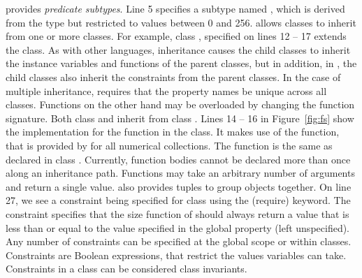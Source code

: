 \noindent \Klang{} provides {\em predicate subtypes}. Line 5 specifies
a subtype named , which is derived from the  type
but restricted to values between 0 and 256. \Klang{} allows classes to
inherit from one or more classes. For example, class ,
specified on lines 12 -- 17 extends the  class. As with
other languages, inheritance causes the child classes to inherit the
instance variables and functions of the parent classes, but in
addition, in \Klang{}, the child classes also inherit the constraints
from the parent classes. In the case of multiple inheritance, \Klang{}
requires that the property names be unique across all
classes. Functions on the other hand may be overloaded by changing the
function signature. Both class  and  inherit from
class . Lines 14 -- 16 in Figure~\ref{fig:fs} show the
implementation for the  function in the 
class. It makes use of the  function, that is provided by
\Klang{} for all numerical collections. The  function is the same as
declared in class . Currently, function bodies cannot be
declared more than once along an inheritance path. Functions may take
an arbitrary number of arguments and return a single value. \Klang{}
also provides tuples to group objects together. On line 27, we
see a constraint being specified for class  using the
 (require) keyword. The constraint specifies that the size function of
 should always return a value that is less than or equal
to the value specified in the global property 
(left unspecified). Any number of constraints can be specified at the
global scope or within classes. Constraints are Boolean expressions, that
restrict the values variables can take. Constraints in a class can be considered
class invariants.

